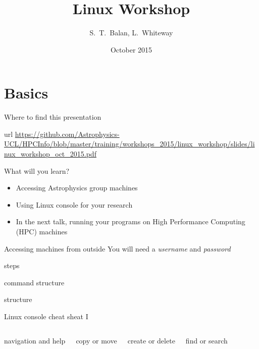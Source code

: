 \documentclass{beamer}
\title[Linux  Workshop] %
{Linux  Workshop}
\author[Balan, Whiteway] %
{S.~T.~Balan, L.~Whiteway}
\institute[UCL]
{
  Department of Physics and Astronomy\\
  University College London
}
\date[Linux  2015]
{October 2015}
\begin{document}
\frame{\titlepage}

\section{Basics}

\begin{frame}{Where to find this presentation}
  \begin{block}{url}
    \url{https://github.com/Astrophysics-UCL/HPCInfo/blob/master/training/workshops_2015/linux_workshop/slides/linux_workshop_oct_2015.pdf}
  \end{block}
\end{frame}


\begin{frame}{What will you learn?}
  \begin{itemize}
    \item Accessing Astrophysics group machines
    \item Using Linux console for your research
    \item In the next talk, running your programs on High Performance Computing (HPC) machines
  \end{itemize}
\end{frame}

\begin{frame}[fragile]{Accessing machines from outside}
  \alert{You will need a \emph{username} and \emph{password}}
  \begin{block}{steps}
    
  \end{block}
\end{frame}

\begin{frame}[fragile]{command structure}
  \begin{block}{structure}
    
  \end{block}
  \begin{example}
    
  \end{example}
\end{frame}


\begin{frame}[fragile]{Linux console cheat sheat I}
  \fontsize{7pt}{7}\selectfont
  \begin{columns}
    \begin{block}{navigation and help}
      
    \end{block}
    \begin{block}{copy or move}
      
    \end{block}

    \begin{block}{create or delete}
      
    \end{block}
    \begin{block}{find or search}
      
    \end{block}
  \end{columns}
\end{frame}
\end{document}
